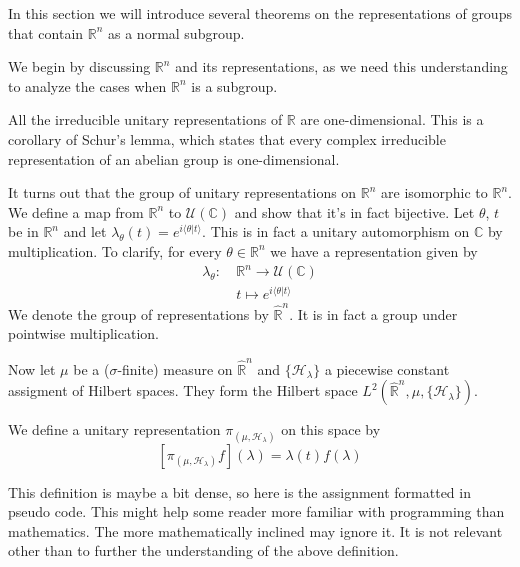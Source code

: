 \documentclass[
  12pt
]{article}
\theoremstyle{break}
\theoremstyle{plain}
\newcommand{\bbr}{\ensuremath{\mathbb{R}}\xspace}
\newcommand{\hilb}{\ensuremath{\mathscr{H}}\xspace}
\begin{document}
  In this section we will introduce several theorems on the representations of
  groups that contain $\bbr^n$ as a normal subgroup.

  We begin by discussing $\bbr^n$ and its representations, as we need this understanding to analyze the cases when $\bbr^n$ is a subgroup.

  All the irreducible unitary representations of \bbr are one-dimensional.
  This is a corollary of Schur's lemma, which states that every complex
  irreducible representation of an abelian group is one-dimensional.

  It turns out that the group of unitary representations on $\mathbb{R}^n$
  are isomorphic to $\mathbb{R}^n$.
  We define a map from $\mathbb{R}^n$ to $\mathcal{U}(\mathbb{C})$ and show that it's in
  fact bijective. Let $\theta$, $t$ be in $\mathbb{R}^n$ and let
  $\lambda_{\theta}(t) = e^{i\langle \theta | t \rangle}$. This is in
  fact a unitary automorphism on $\mathbb{C}$ by multiplication. To
  clarify, for every $\theta \in \mathbb{R}^n$ we have a representation
  given by
  \begin{align*}
    \lambda_{\theta}:\ & \mathbb{R}^n \rightarrow \mathcal{U}(\mathbb{C}) \\
    & t \mapsto e^{i \langle \theta | t \rangle}
  \end{align*}
  We denote the group of representations by $\hat{\mathbb{R}}^n$. It
  is in fact a group under pointwise multiplication.

  Now let $\mu$ be a ($\sigma$-finite) measure on $\hat{\bbr}^n$ and
  $\{\hilb_{\lambda}\}$ a piecewise constant assigment of Hilbert spaces. They
  form the Hilbert space $L^2(\hat{\bbr}^n, \mu, \{\hilb_{\lambda}\})$.

  We define a unitary representation $\pi_{(\mu, \hilb_{\lambda})}$ on this space by
  $$
    [\pi_{(\mu, \hilb_{\lambda})} f](\lambda) = \lambda(t)f(\lambda)
  $$

  This definition is maybe a bit dense, so here is the assignment formatted in
  pseudo code. This might help some reader more familiar with programming than
  mathematics. The more mathematically inclined may ignore it. It is not
  relevant other than to further the understanding of the above definition.
\end{document}
